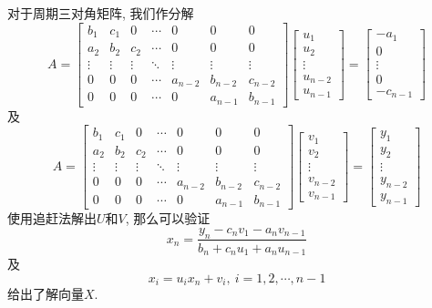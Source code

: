 \documentclass{article}
\begin{document}
对于周期三对角矩阵, 我们作分解
\[A=\begin{bmatrix}
    b_1 & c_1 & 0 & \cdots & 0 & 0 & 0 \\
    a_2 & b_2 & c_2 & \cdots & 0 & 0 & 0 \\
    \vdots & \vdots & \vdots & \ddots & \vdots & \vdots & \vdots \\
    0 & 0 & 0 & \cdots & a_{n-2} & b_{n-2} & c_{n-2} \\
    0 & 0 & 0 & \cdots & 0 & a_{n-1} & b_{n-1}
\end{bmatrix}\begin{bmatrix}
    u_1 \\ u_2 \\ \vdots \\ u_{n-2} \\ u_{n-1}
\end{bmatrix}=\begin{bmatrix}
    -a_1 \\ 0 \\ \vdots \\ 0 \\ -c_{n-1}
\end{bmatrix}\]
及
\[A=\begin{bmatrix}
    b_1 & c_1 & 0 & \cdots & 0 & 0 & 0 \\
    a_2 & b_2 & c_2 & \cdots & 0 & 0 & 0 \\
    \vdots & \vdots & \vdots & \ddots & \vdots & \vdots & \vdots \\
    0 & 0 & 0 & \cdots & a_{n-2} & b_{n-2} & c_{n-2} \\
    0 & 0 & 0 & \cdots & 0 & a_{n-1} & b_{n-1}
\end{bmatrix}\begin{bmatrix}
    v_1 \\ v_2 \\ \vdots \\ v_{n-2} \\ v_{n-1}
\end{bmatrix}=\begin{bmatrix}
    y_1 \\ y_2 \\ \vdots \\ y_{n-2} \\ y_{n-1}
\end{bmatrix}\]
使用追赶法解出$U$和$V$, 那么可以验证
\[x_n=\frac{y_n-c_nv_1-a_nv_{n-1}}{b_n+c_nu_1+a_nu_{n-1}}\]
及
\[x_i=u_ix_n+v_i,\ i=1,2,\cdots,n-1\]
给出了解向量$X$.
\end{document}
